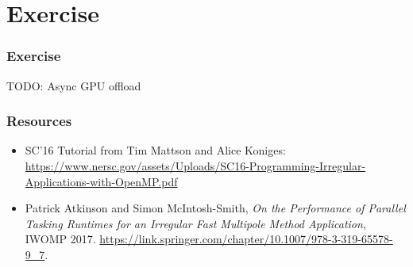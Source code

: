 \documentclass{beamer}
\begin{document}
\section{Exercise}
\begin{frame}
\frametitle{Exercise}
TODO: Async GPU offload
\end{frame}

\begin{frame}
\frametitle{Resources}
\begin{itemize}
  \item SC'16 Tutorial from Tim Mattson and Alice Koniges: \url{https://www.nersc.gov/assets/Uploads/SC16-Programming-Irregular-Applications-with-OpenMP.pdf}
  \item Patrick Atkinson and Simon McIntosh-Smith, \emph{On the Performance of Parallel Tasking Runtimes for an Irregular Fast Multipole Method Application}, IWOMP 2017. \url{https://link.springer.com/chapter/10.1007/978-3-319-65578-9_7}.
\end{itemize}
\end{frame}
\end{document}
